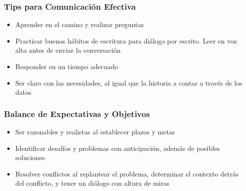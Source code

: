 \subsubsection{Tips para Comunicación Efectiva}
\begin{itemize}
    \item {Aprender en el camino y realizar preguntas}
    \item {Practicar buenos hábitos de escritura para diálogo por escrito. Leer en voz alta antes de enviar la conversación}
    \item {Responder en un tiempo adecuado}
    \item {Ser claro con las necesidades, al igual que la historia a contar a través de los datos}
\end{itemize}

\subsubsection{Balance de Expectativas y Objetivos}
\begin{itemize}
    \item {Ser razonables y realistas al establecer plazos y metas}
    \item {Identificar desafíos y problemas con anticipación, además de posibles soluciones}
    \item {Resolver conflictos al replantear el problema, determinar el contexto detrás del conflicto, y tener un diálogo con altura de miras}
\end{itemize}

